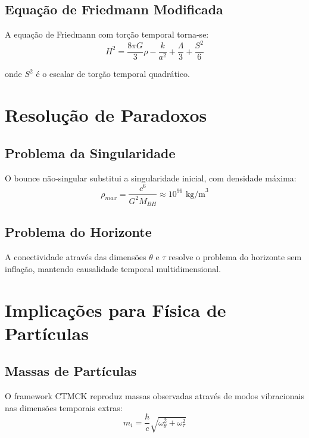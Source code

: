 \documentclass[reprint,amsmath,amssymb,aps,prd]{revtex4-2}
\begin{document}
\subsection{Equação de Friedmann Modificada}

A equação de Friedmann com torção temporal torna-se:
\begin{equation}
H^2 = \frac{8\pi G}{3}\rho - \frac{k}{a^2} + \frac{\Lambda}{3} + \frac{S^2}{6}
\end{equation}

onde $S^2$ é o escalar de torção temporal quadrático.

\section{Resolução de Paradoxos}

\subsection{Problema da Singularidade}

O bounce não-singular substitui a singularidade inicial, com densidade máxima:
\begin{equation}
\rho_{max} = \frac{c^6}{G^2 M_{BH}} \approx 10^{96} \text{ kg/m}^3
\end{equation}

\subsection{Problema do Horizonte}

A conectividade através das dimensões $\theta$ e $\tau$ resolve o problema do horizonte sem inflação, mantendo causalidade temporal multidimensional.

\section{Implicações para Física de Partículas}

\subsection{Massas de Partículas}

O framework CTMCK reproduz massas observadas através de modos vibracionais nas dimensões temporais extras:
\begin{equation}
m_i = \frac{\hbar}{c} \sqrt{\omega_\theta^2 + \omega_\tau^2}
\end{equation}
\end{document}
